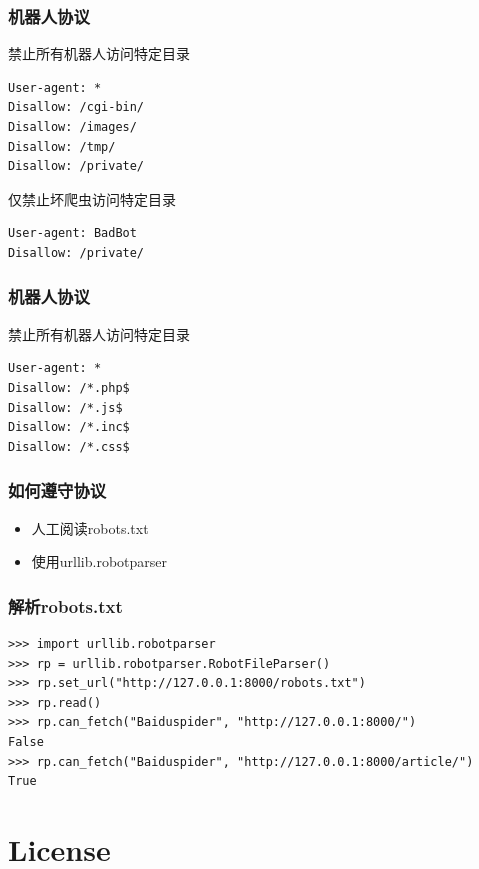 \documentclass{beamer}
\begin{document}
\begin{frame}[t,fragile]
  \frametitle{机器人协议}
	\begin{block}
		{禁止所有机器人访问特定目录}
\begin{verbatim}
User-agent: *
Disallow: /cgi-bin/
Disallow: /images/
Disallow: /tmp/
Disallow: /private/
\end{verbatim}
	\end{block}
	\begin{block}
		{仅禁止坏爬虫访问特定目录}
\begin{verbatim}
User-agent: BadBot
Disallow: /private/
\end{verbatim}
	\end{block}
\end{frame}

\begin{frame}[t,fragile]
  \frametitle{机器人协议}
	\begin{block}
		{禁止所有机器人访问特定目录}
\begin{verbatim}
User-agent: *
Disallow: /*.php$
Disallow: /*.js$
Disallow: /*.inc$
Disallow: /*.css$
\end{verbatim}
	\end{block}
\end{frame}

\begin{frame}
  \frametitle{如何遵守协议}
	\begin{block}
		{}
		\begin{itemize}
			\item 人工阅读robots.txt
			\item 使用urllib.robotparser
		\end{itemize}
	\end{block}
\end{frame}

\begin{frame}[t,fragile]
  \frametitle{解析robots.txt}
	\scriptsize
\begin{verbatim}
>>> import urllib.robotparser
>>> rp = urllib.robotparser.RobotFileParser()
>>> rp.set_url("http://127.0.0.1:8000/robots.txt")
>>> rp.read()
>>> rp.can_fetch("Baiduspider", "http://127.0.0.1:8000/")
False
>>> rp.can_fetch("Baiduspider", "http://127.0.0.1:8000/article/")
True
\end{verbatim}
	
\end{frame}
\section{License} %
\label{sec:License}
\end{document}
